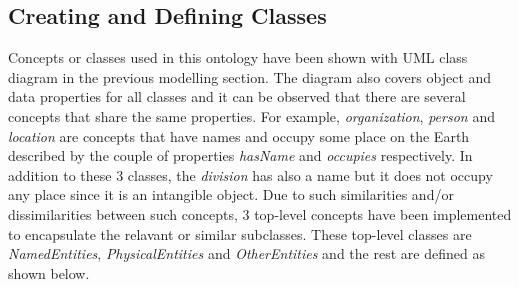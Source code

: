 \documentclass[a4paper]{article}
\begin{document}
\subsection{Creating and Defining Classes}
Concepts or classes used in this ontology have been shown with UML class diagram in the previous modelling section. The diagram also covers object and data properties for all classes and it 
can be observed that there are several concepts that share the same properties. For example, \textit{organization}, \textit{person} and \textit{location} are concepts that have names and 
occupy some place on the Earth described by the couple of properties \textit{hasName} and \textit{occupies} respectively. In addition to these 3 classes, the \textit{division} has also a name 
but it does not occupy any place since it is an intangible object. Due to such similarities and/or dissimilarities between such concepts, 3 top-level concepts have been implemented to encapsulate 
the relavant or similar subclasses. These top-level classes are \textit{NamedEntities}, \textit{PhysicalEntities} and \textit{OtherEntities} and the rest are defined as shown below.
\end{document}
